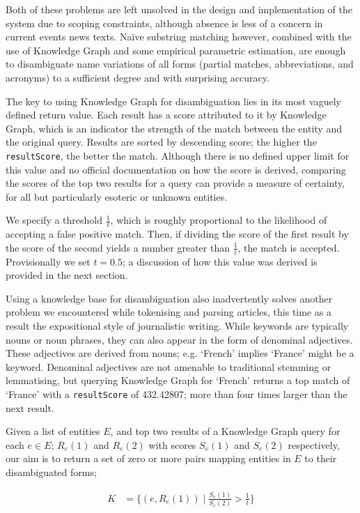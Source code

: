 Both of these problems are left unsolved in the design and implementation of the system due to scoping constraints, although absence is less of a concern in current events news texts. Na\"{i}ve substring matching however, combined with the use of Knowledge Graph and some empirical parametric estimation, are enough to disambiguate name variations of all forms (partial matches, abbreviations, and acronyms) to a sufficient degree and with surprising accuracy.

The key to using Knowledge Graph for disambiguation lies in its most vaguely defined return value. Each result has a score attributed to it by Knowledge Graph, which is an indicator the strength of the match between the entity and the original query. Results are sorted by descending score; the higher the \texttt{resultScore}, the better the match. Although there is no defined upper limit for this value and no official documentation on how the score is derived, comparing the scores of the top two results for a query can provide a measure of certainty, for all but particularly esoteric or unknown entities.

We specify a threshold $\frac{1}{t}$, which is roughly proportional to the likelihood of accepting a false positive match. Then, if dividing the score of the first result by the score of the second yields a number greater than $\frac{1}{t}$, the match is accepted. Provisionally we set $t=0.5$; a discussion of how this value was derived is provided in the next section.

Using a knowledge base for disambiguation also inadvertently solves another problem we encountered while tokenising and parsing articles, this time as a result the expositional style of journalistic writing. While keywords are typically nouns or noun phrases, they can also appear in the form of denominal adjectives. These adjectives are derived from nouns; e.g. `French' implies `France' might be a keyword. Denominal adjectives are not amenable to traditional stemming or lemmatising, but querying Knowledge Graph for `French' returns a top match of `France' with a \texttt{resultScore} of 432.42807; more than four times larger than the next result.

Given a list of entities $E$, and top two results of a Knowledge Graph query for each $e \in E$; $R_e(1)$ and $R_e(2)$ with scores $S_e(1)$ and $S_e(2)$ respectively, our aim is to return a set of zero or more pairs mapping entities in $E$ to their disambiguated forms;

\begin{align*}
K &= \bigg\{(e, R_e(1))\;|\;\frac{S_e(1)}{S_e(2)} > \frac{1}{t}\bigg\}
\end{align*}

